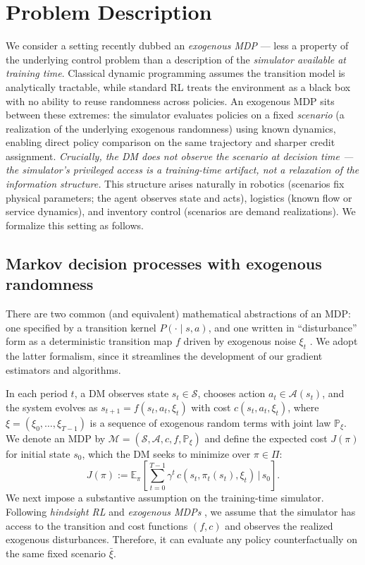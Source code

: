 \documentclass{article}
\theoremstyle{definition}
\theoremstyle{remark}
\begin{document}
\section{Problem Description}\label{sec:problem-description}

We consider a setting recently dubbed an \emph{exogenous MDP} — less a property of the underlying control problem than a description of the \emph{simulator available at training time}. Classical dynamic programming assumes the transition model is analytically tractable, while standard RL treats the environment as a black box with no ability to reuse randomness across policies. An exogenous MDP sits between these extremes: the simulator evaluates policies on a fixed \emph{scenario} (a realization of the underlying exogenous randomness) using known dynamics, enabling direct policy comparison on the same trajectory and sharper credit assignment. \emph{Crucially, the DM does not observe the scenario at decision time — the simulator's privileged access is a training-time artifact, not a relaxation of the information structure.} This structure arises naturally in robotics (scenarios fix physical parameters; the agent observes state and acts), logistics (known flow or service dynamics), and inventory control (scenarios are demand realizations). We formalize this setting as follows.

\subsection{Markov decision processes with exogenous randomness \label{sec:mdp} }

There are two common (and equivalent) mathematical abstractions of an MDP: one specified by a transition kernel $P(\cdot\mid s,a)$, and one written in ``disturbance'' form as a deterministic transition map $f$ driven by exogenous noise $\xi_t$ \citep{bertsekas2012dynamic}. 
We adopt the latter formalism, since it streamlines the development of our gradient estimators and algorithms.

In each period $t$, a DM observes state $s_t\in\mathcal{S}$, chooses action $a_t\in\mathcal{A}(s_t)$, and the system evolves as $s_{t+1}=f(s_t,a_t,\xi_t)$ with cost $c(s_t,a_t,\xi_t)$, where $\xi=(\xi_0,\ldots,\xi_{T-1})$ is a sequence of exogenous random terms with joint law $\mathbb{P}_{\xi}$. We denote an MDP by $\mathcal{M}=(\mathcal{S},\mathcal{A},c,f,\mathbb{P}_{\xi})$ and
define the expected cost $J(\pi)$ for initial state $s_0$, which the DM seeks to minimize over $\pi\in\Pi$:
\[
J(\pi) := \mathbb{E}_{\pi}\!\left[\sum_{t=0}^{T-1} \gamma^t\, c(s_t,\pi_t(s_t),\xi_t)\,\Big|\,s_0\right].
\]
We next impose a substantive assumption on the training-time simulator. Following \textit{hindsight RL} \citep{alvo2023deep,xie2024vc} and \textit{exogenous MDPs} \citep{sinclair2022hindsight}, we assume that the simulator has access to the transition and cost functions $(f,c)$ and observes the realized exogenous disturbances. Therefore, it can evaluate any policy counterfactually on the same fixed scenario $\bar{\xi}$.
\end{document}
